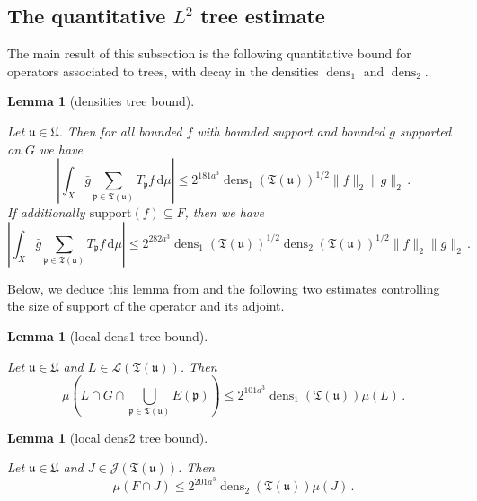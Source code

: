 \documentclass[10pt,a4paper]{article}
\theoremstyle{plain}
\newtheorem{lemma}[theorem]{Lemma}
\theoremstyle{definition}
\numberwithin{equation}{subsection}
\DeclareMathOperator{\dens}{\operatorname{dens}}
\newcommand{\fp}{{\mathfrak p}}
\newcommand{\fu}{{\mathfrak u}}
\newcommand{\fU}{{\mathfrak U}}
\newcommand{\fT}{{\mathfrak T}}
\newcommand{\lean}[1]{}
\newcommand{\uses}[1]{}
\newcommand{\leanok}{}
\begin{document}
\subsection{The quantitative \texorpdfstring{$L^2$}{L2} tree estimate}

The main result of this subsection is the following quantitative bound for operators associated to trees, with decay in the densities $\dens_1$ and $\dens_2$.

\begin{lemma}[densities tree bound]
    \label{densities-tree-bound}
    \leanok
    \lean{TileStructure.Forest.density_tree_bound1, TileStructure.Forest.density_tree_bound2}
    \uses{tree-projection-estimate,local-dens1-tree-bound,local-dens2-tree-bound}
    Let $\fu \in \fU$. Then for all bounded $f$ with bounded support and bounded $g$ supported on $G$ we have
    \begin{equation}
        \label{eq-cor-tree-est}
        \left|\int_X \bar g \sum_{\fp \in \fT(\fu)} T_{\fp }f \, \mathrm{d}\mu \right| \le 2^{181a^3} \dens_1(\fT(\fu))^{1/2} \|f\|_2\|g\|_2\,.
    \end{equation}
    If additionally $\text{support}(f) \subseteq F$, then we have
    \begin{equation}
        \label{eq-cor-tree-est-F}
        \left| \int_X \bar g \sum_{\fp \in \fT(\fu)} T_{\fp }f\, \mathrm{d}\mu \right| \le 2^{282a^3} \dens_1(\fT(\fu))^{1/2} \dens_2(\fT(\fu))^{1/2} \|f\|_2\|g\|_2\,.
    \end{equation}
\end{lemma}

Below, we deduce this lemma from  and the following two estimates controlling the size of support of the operator and its adjoint.

\begin{lemma}[local dens1 tree bound]
    \label{local-dens1-tree-bound}
    \leanok
    \lean{TileStructure.Forest.local_dens1_tree_bound}
    \uses{monotone-cube-metrics}
    Let $\fu \in \fU$ and $L \in \mathcal{L}(\fT(\fu))$. Then
    \begin{equation}
    \label{eq-1density-estimate-tree}
        \mu(L \cap G \cap \bigcup_{\fp \in \fT(\fu)} E(\fp)) \le 2^{101a^3} \dens_1(\fT(\fu)) \mu(L)\,.
    \end{equation}
\end{lemma}

\begin{lemma}[local dens2 tree bound]
    \label{local-dens2-tree-bound}
    \leanok
    \lean{TileStructure.Forest.local_dens2_tree_bound}
    Let $\fu \in \fU$ and $J \in \mathcal{J}(\fT(\fu))$. Then
    $$
        \mu(F \cap J) \le 2^{201a^3} \dens_2(\fT(\fu)) \mu(J)\,.
    $$
\end{lemma}
\end{document}
